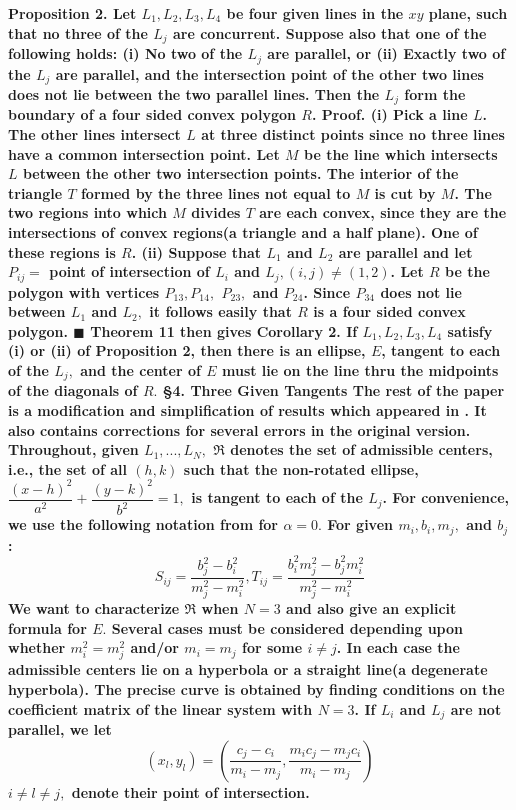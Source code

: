 \bf Proposition 2. \rm Let $L_{1},L_{2},L_{3},L_{4}$ be four given lines in the $xy$ plane, such that no three of the $L_{j}$ are concurrent. Suppose also that one of the following holds: \newline 
(i) No \bf two \rm of the $L_{j}$ are parallel, or \nl	
(ii) Exactly two of the $L_{j}$ are parallel, and the intersection point of the other two lines does not lie between the two parallel lines. \nl Then the $L_{j}$ form the boundary of a four sided convex polygon $R$. \nl
\bf Proof. \rm (i) Pick a line $L$. The other lines intersect $L$ at three distinct points since no three lines have a common intersection point. Let $M$ be the line which intersects $L$ between the other two intersection points. The interior of the triangle $T$ formed by the three lines not equal to $M$ is cut by $M$. The two regions into which $M$ divides $T$ are each convex, since they are the intersections of convex regions(a triangle and a half plane). One of these regions is $R$. \nl
(ii) Suppose that $L_{1}$ and $L_{2}$ are parallel and let $P_{ij}=$ point of intersection of $L_{i}$ and $L_{j},(i,j)\neq (1,2)$. Let $R$ be the polygon with vertices $P_{13},P_{14},$ $P_{23},$ and $P_{24}$. Since $P_{34}$ does not lie between $L_{1}$ and $L_{2},$ it follows easily that $R$ is a four sided convex polygon. $\blacksquare$ \nl 	Theorem 11 then gives \nl
\bf Corollary 2. \rm If $L_{1},L_{2},L_{3},L_{4}$ satisfy (i) or (ii) of Proposition 2, then there is an ellipse, $E$, tangent to each of the $L_{j},$ and the center of $E$ must lie on the line thru the midpoints of the diagonals of $R.$ \nl \nl
\bf \S 4. Three Given Tangents \rm \newline
	The rest of the paper is a modification and simplification of results which appeared in \cite{3}. It also contains corrections for several errors in the original version. \nl \nl Throughout, given $L_{1},...,L_{N},$ $\Re $ denotes the set of admissible centers, i.e., the set of all $(h,k)$ such that the \bf non-rotated \rm ellipse,$\dfrac{(x-h)^{2}}{a^{2}}+\dfrac{(y-k)^{2}}{b^{2}}=1,$ is tangent to each of the $L_{j}$. For convenience, we use the following notation from  for $\alpha =0.$ For given $m_{i},b_{i},m_{j},$ and $b_{j}$: $$S_{ij}=\dfrac{b_{j}^{2}-b_{i}^{2}}{m_{j}^{2}-m_{i}^{2}},T_{ij}=\dfrac{b_{i}^{2}m_{j}^{2}-b_{j}^{2}m_{i}^{2}}{m_{j}^{2}-m_{i}^{2}}$$ We want to characterize $\Re $ when $N=3$ and also give an explicit formula for $E.$ Several cases must be considered depending upon whether $m_{i}^{2}=m_{j}^{2}$ and/or $m_{i}=m_{j}$ for some $i\neq j$. In each case the admissible centers lie on a hyperbola or a straight line(a degenerate hyperbola). The precise curve is obtained by finding conditions on the coefficient matrix of the linear system  with $N=3$. If $L_{i}$ and $L_{j}$ are not parallel, we let $$(x_{l},y_{l})=\left( \frac{c_{j}-c_{i}}{m_{i}-m_{j}},\frac{m_{i}c_{j}-m_{j}c_{i}}{m_{i}-m_{j}}\right) \tag{35}$$ $i\neq l\neq j,$ denote their point of intersection. \nl
